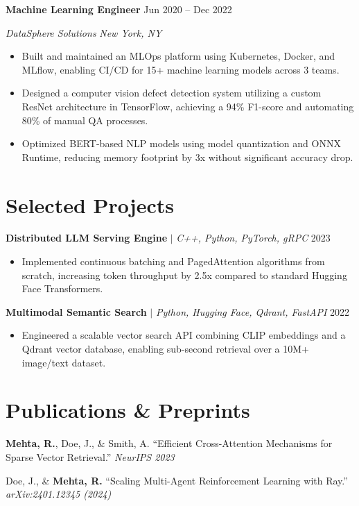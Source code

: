 \documentclass[10pt,a4paper]{article}
\newcommand{\resumeHeading}[4]{
  \vspace{0.2em}\noindent
  \textbf{#1} \hfill #2 \par
  \vspace{-0.1em}\noindent
  \textit{#3} \hfill \textit{#4} \par
}
\newcommand{\resumeProject}[3]{
  \vspace{0.2em}\noindent
  \textbf{#1} $|$ \textit{#2} \hfill #3 \par
}
\newcommand{\resumePub}[2]{
  \vspace{0.2em}\noindent
  {#1} \hfill \textit{#2} \par
}
\begin{document}
\resumeHeading{Machine Learning Engineer}{Jun 2020 -- Dec 2022}{DataSphere Solutions}{New York, NY}
\vspace{-0.3em}
\begin{itemize}[leftmargin=0.15in, itemsep=0.1em, parsep=0pt]
    \item Built and maintained an MLOps platform using Kubernetes, Docker, and MLflow, enabling CI/CD for 15+ machine learning models across 3 teams.
    \item Designed a computer vision defect detection system utilizing a custom ResNet architecture in TensorFlow, achieving a 94\% F1-score and automating 80\% of manual QA processes.
    \item Optimized BERT-based NLP models using model quantization and ONNX Runtime, reducing memory footprint by 3x without significant accuracy drop.
\end{itemize}

\section*{Selected Projects}

\resumeProject{Distributed LLM Serving Engine}{C++, Python, PyTorch, gRPC}{2023}
\vspace{-0.3em}
\begin{itemize}[leftmargin=0.15in, itemsep=0.1em, parsep=0pt]
    \item Implemented continuous batching and PagedAttention algorithms from scratch, increasing token throughput by 2.5x compared to standard Hugging Face Transformers.
\end{itemize}

\resumeProject{Multimodal Semantic Search}{Python, Hugging Face, Qdrant, FastAPI}{2022}
\vspace{-0.3em}
\begin{itemize}[leftmargin=0.15in, itemsep=0.1em, parsep=0pt]
    \item Engineered a scalable vector search API combining CLIP embeddings and a Qdrant vector database, enabling sub-second retrieval over a 10M+ image/text dataset.
\end{itemize}

\section*{Publications \& Preprints}

\resumePub{\textbf{Mehta, R.}, Doe, J., \& Smith, A. ``Efficient Cross-Attention Mechanisms for Sparse Vector Retrieval.''}{NeurIPS 2023}
\vspace{0.2em}
\resumePub{Doe, J., \& \textbf{Mehta, R.} ``Scaling Multi-Agent Reinforcement Learning with Ray.''}{arXiv:2401.12345 (2024)}
\end{document}
